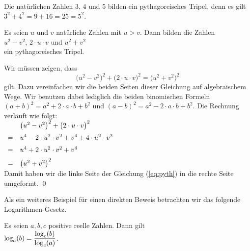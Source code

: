 \example
Die nat\"urlichen Zahlen $3$, $4$ und $5$ bilden ein pythagoreisches Tripel, denn es gilt
\\[0.2cm]
\hspace*{1.3cm}
$3^2 + 4^2 = 9 + 16 = 25 = 5^2$. \eox


\begin{Satz} 
Es seien $u$ und $v$ nat\"{u}rliche Zahlen mit $u > v$.  Dann bilden die Zahlen
\\[0.2cm]
\hspace*{1.3cm}
$u^2 - v^2$, \quad $2 \cdot u \cdot v$ \quad und \quad $u^2 + v^2$
\\[0.2cm]
ein pythagoreisches Tripel.  
\end{Satz}

\proof
Wir m\"{u}ssen zeigen, dass
\begin{equation}
  \label{eq:pyth}
\bigl( u^2 - v^2 \bigr)^2 + \bigl(2 \cdot u \cdot v \bigr)^2 = \bigl(u^2 + v^2\bigr)^2  
\end{equation}
gilt.  Dazu vereinfachen wir die beiden Seiten dieser Gleichung auf algebraischem Wege.
Wir benutzen dabei lediglich die beiden binomischen Formeln 
$(a + b)^2 = a^2 + 2 \cdot a \cdot b + b^2$ und
$(a - b)^2 = a^2 - 2 \cdot a \cdot b + b^2$.
Die Rechnung verl\"{a}uft wie folgt:
\\[0.2cm]
\hspace*{1.3cm}
$
\begin{array}[t]{cl}
   & \bigl( u^2 - v^2 \bigr)^2 + \bigl(2 \cdot u \cdot v \bigr)^2 \\[0.2cm]
 = & u^4 - 2 \cdot u^2 \cdot v^2 + v^4  + 4 \cdot u^2 \cdot v^2 \\[0.2cm]
 = & u^4 + 2 \cdot u^2 \cdot v^2 + v^4 \\[0.2cm]
 = & \bigl(u^2 + v^2\bigr)^2 
\end{array}
$
\\[0.2cm]
Damit haben wir die linke Seite der Gleichung (\ref{eq:pyth}) in die rechte Seite umgeformt. \qed

Als ein weiteres Beispiel f\"{u}r einen direkten Beweis betrachten wir das folgende Logarithmen-Gesetz.

\begin{Satz}
  Es seien $a,b,c$ positive reelle Zahlen.  Dann gilt
  \\[0.2cm]
  \hspace*{1.3cm}
  $\displaystyle\log_a(b) = \frac{\log_c(b)}{\log_c(a)}$.
\end{Satz}

